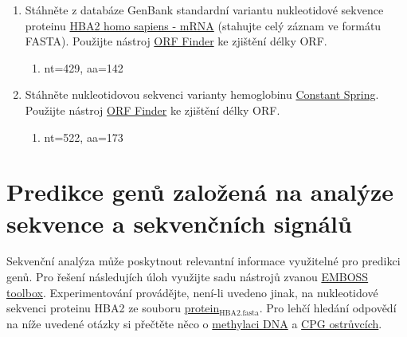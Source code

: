 \documentclass[11pt]{article}
\begin{document}
\begin{enumerate}
\item Stáhněte z databáze GenBank standardní variantu nukleotidové sekvence
proteinu \href{http://www.ncbi.nlm.nih.gov/nuccore/NM\_000517.4}{HBA2 homo sapiens - mRNA} (stahujte celý záznam ve formátu
FASTA). Použijte nástroj \href{https://www.ncbi.nlm.nih.gov/orffinder/}{ORF Finder} ke zjištění délky ORF.
\begin{enumerate}
\item nt=429, aa=142
\end{enumerate}
\item Stáhněte nukleotidovou sekvenci varianty hemoglobinu \href{./constant\_spring\_rna.txt}{Constant
Spring}. Použijte nástroj \href{https://www.ncbi.nlm.nih.gov/orffinder/}{ORF Finder} ke zjištění délky ORF.
\begin{enumerate}
\item nt=522, aa=173
\end{enumerate}
\end{enumerate}

\section{Predikce genů založená na analýze sekvence a sekvenčních signálů}
\label{sec:orgaa22ef8}
Sekvenční analýza může poskytnout relevantní informace využitelné pro predikci
genů. Pro řešení následujích úloh využijte sadu nástrojů zvanou \href{http://emboss.bioinformatics.nl}{EMBOSS
toolbox}. Experimentování provádějte, není-li uvedeno jinak, na nukleotidové
sekvenci proteinu HBA2 ze souboru \href{./protein\_HBA2.fasta}{protein\(_{\text{HBA2.fasta}}\)}. Pro lehčí hledání odpovědí
na níže uvedené otázky si přečtěte něco o \href{https://cs.wikipedia.org/wiki/Methylace\_DNA}{methylaci DNA} a \href{https://en.wikipedia.org/wiki/CpG\_site\#CpG\_islands}{CPG ostrůvcích}.
\end{document}
